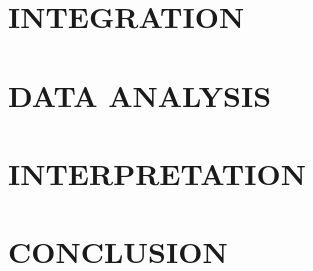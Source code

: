\documentclass[12pt]{article}
\begin{document}
\section{INTEGRATION}

%

\section{DATA ANALYSIS}

%

\section{INTERPRETATION}

%

\section{CONCLUSION}

%




\end{document}
